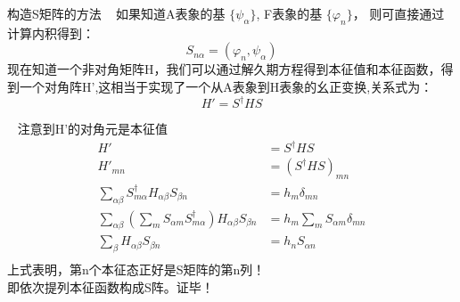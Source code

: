 \begin{frame}{构造S矩阵的方法}
     \解~ 如果知道A表象的基 $\{\psi_\alpha \}$, F表象的基 $ \{\varphi_n \}$， 则可直接通过计算内积得到：
     $$ S_{n\alpha} =(\varphi_n, \psi_\alpha) $$
     现在知道一个非对角矩阵H，我们可以通过解久期方程得到本征值和本征函数，得到一个对角阵H',这相当于实现了一个从A表象到H表象的幺正变换,关系式为：
     $$ H'=S^\dagger H S$$
\end{frame}  

\begin{frame}
    \例[9.试证明F在A表象的本征函数系构成这个S矩阵]{}
    \证~ 注意到H'的对角元是本征值
    \begin{equation*}
    \begin{split}
    H' &=S^\dagger H S \\
    H'_{mn} &=(S^\dagger H S)_{mn}  \\
    \sum_{\alpha \beta} S^{\dagger} _{m \alpha} H_{\alpha \beta} S_{\beta n} & = h_m \delta_{mn} \\
    \sum_{\alpha \beta} (\sum_m S_{\alpha m} S^\dagger_{m \alpha}) H_{\alpha \beta} S_{\beta n} &= h_m \sum_m S_{\alpha m}\delta_{mn} \\
    \sum_{\beta} H_{\alpha \beta} S_{\beta n} &= h_n S_{\alpha n} \\
    \end{split} 
    \end{equation*} 
    上式表明，第n个本征态正好是S矩阵的第n列！\\
    即依次提列本征函数构成S阵。证毕！
\end{frame} 


 



